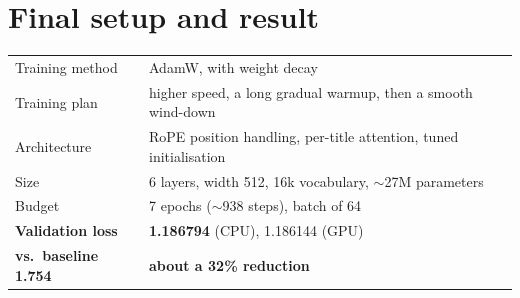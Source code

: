 \documentclass[11pt]{article}
\begin{document}
\section*{Final setup and result}
\begin{center}
\begin{tabular}{ll}
\toprule
Training method & AdamW, with weight decay \\
Training plan & higher speed, a long gradual warmup, then a smooth wind-down \\
Architecture & RoPE position handling, per-title attention, tuned initialisation \\
Size & 6 layers, width 512, 16k vocabulary, $\sim$27M parameters \\
Budget & 7 epochs ($\sim$938 steps), batch of 64 \\
\midrule
\textbf{Validation loss} & \textbf{1.186794} (CPU), 1.186144 (GPU) \\
\textbf{vs.\ baseline 1.754} & \textbf{about a 32\% reduction} \\
\bottomrule
\end{tabular}
\end{center}
\end{document}
